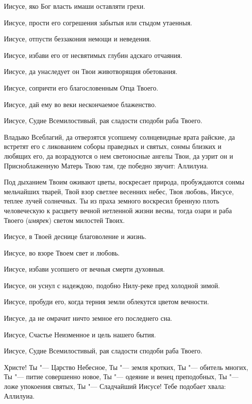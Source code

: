 \begin{mymulticols}
Иисусе, яко Бог власть имаши оставляти грехи. 

Иисусе, прости его согрешения забытыя или стыдом утаенныя. 

Иисусе, отпусти беззакония немощи и неведения. 

Иисусе, избави его от несвятимых глубин адскаго отчаяния. 

Иисусе, да унаследует он Твои животворящия обетования. 

Иисусе, сопричти его благословенным Отца Твоего. 

Иисусе, дай ему во веки нескончаемое блаженство. 

Иисусе, Судие Всемилостивый, рая сладости сподоби раба Твоего.




Владыко Всеблагий, да отверзятся усопшему солнцевидные врата райские, да встретят его с ликованием соборы праведных и святых, сонмы близких и любящих его, да возрадуются о нем светоносные ангелы Твои, да узрит он и Присноблаженную Матерь Твою там, где победно звучит: Аллилуиа.




Под дыханием Твоим оживают цветы, воскресает природа, пробуждаются сонмы мельчайших тварей, Твой взор светлее весенних небес, Твоя любовь, Иисусе, теплее лучей солнечных. Ты из праха земного воскресил бренную плоть человеческую к расцвету вечной нетленной жизни весны, тогда озари и раба Твоего ({\itshape имярек}) светом милостей Твоих. 

Иисусе, в Твоей деснице благоволение и жизнь. 

Иисусе, во взоре Твоем свет и любовь. 

Иисусе, избави усопшего от вечныя смерти духовныя. 

Иисусе, он уснул с надеждою, подобно Нилу-реке пред холодной зимой. 

Иисусе, пробуди его, когда терния земли облекутся цветом вечности. 

Иисусе, да не омрачит ничто земное его последнего сна. 

Иисусе, Счастье Неизменное и цель нашего бытия. 

Иисусе, Судие Всемилостивый, рая сладости сподоби раба Твоего.




Христе! Ты "--- Царство Небесное, Ты "--- земля кротких, Ты "--- обитель многих, Ты "--- питие совершенно новое, Ты "--- одеяние и венец преподобных, Ты "--- ложе упокоения святых, Ты "--- Сладчайший Иисусе! Тебе подобает хвала: Аллилуиа.



\end{mymulticols}
